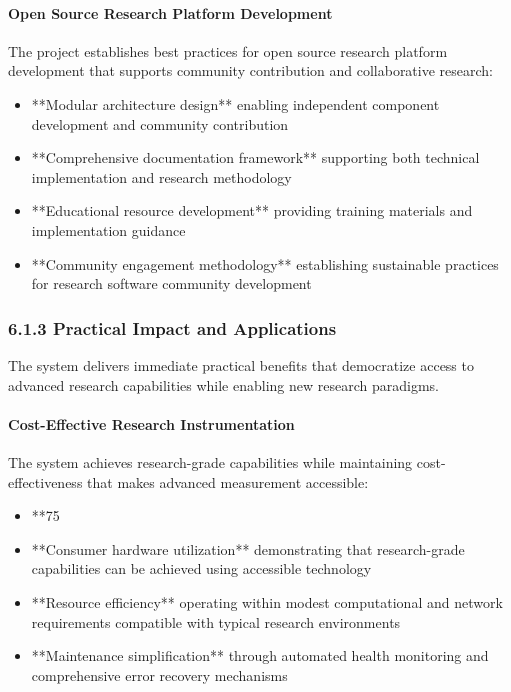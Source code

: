 \documentclass[12pt,a4paper]{article}
\begin{document}
\paragraph{Open Source Research Platform Development}

The project establishes best practices for open source research platform development that supports community
contribution and collaborative research:

\begin{itemize}
\item **Modular architecture design** enabling independent component development and community contribution
\item **Comprehensive documentation framework** supporting both technical implementation and research methodology
\item **Educational resource development** providing training materials and implementation guidance
\item **Community engagement methodology** establishing sustainable practices for research software community development

\end{itemize}
\subsubsection{6.1.3 Practical Impact and Applications}

The system delivers immediate practical benefits that democratize access to advanced research capabilities while
enabling new research paradigms.

\paragraph{Cost-Effective Research Instrumentation}

The system achieves research-grade capabilities while maintaining cost-effectiveness that makes advanced measurement
accessible:

\begin{itemize}
\item **75%
\item **Consumer hardware utilization** demonstrating that research-grade capabilities can be achieved using accessible
  technology
\item **Resource efficiency** operating within modest computational and network requirements compatible with typical
  research environments
\item **Maintenance simplification** through automated health monitoring and comprehensive error recovery mechanisms

\end{itemize}
\end{document}
